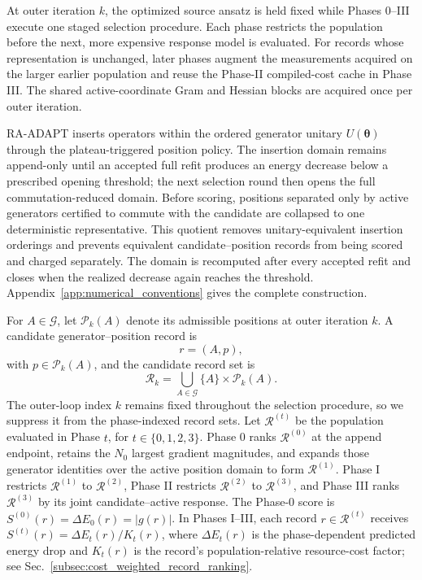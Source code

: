 \documentclass[
  reprint,
  amsmath,
  amssymb,
  aps,
  pra,
  nofootinbib,
  superscriptaddress,
  floatfix
]{revtex4-2}
\begin{document}
At outer iteration \(k\), the optimized source ansatz is held fixed while
Phases 0--III execute one staged selection procedure. Each phase
restricts the population before the next, more expensive response model is
evaluated. For records whose representation is unchanged, later phases augment
the measurements acquired on the larger earlier population and reuse the
Phase-II compiled-cost cache in Phase III. The shared active-coordinate Gram
and Hessian blocks are acquired once per outer iteration.

RA-ADAPT inserts operators within the ordered generator unitary
\(U(\boldsymbol{\theta})\) through the plateau-triggered position policy. The insertion domain remains append-only
until an accepted full refit produces an energy decrease below a prescribed
opening threshold; the next selection round then opens
the full commutation-reduced domain. Before scoring, positions
separated only by active generators certified to commute with the candidate
are collapsed to one deterministic representative. This quotient removes
unitary-equivalent insertion orderings and prevents equivalent
candidate--position records from being scored and charged separately. The
domain is recomputed after every accepted refit and closes when the realized
decrease again reaches the threshold. Appendix~\ref{app:numerical_conventions}
gives the complete construction.

For \(A\in\mathcal G\), let \(\mathcal P_k(A)\) denote its admissible positions
at outer iteration \(k\). A candidate generator--position record is
\[
r=(A,p),
\]
with \(p\in\mathcal P_k(A)\), and the candidate record set is
\begin{equation}
\mathcal R_k
=
\bigcup_{A\in\mathcal G}
\{A\}\times\mathcal P_k(A).
\label{record_set}
\end{equation}
The outer-loop index \(k\) remains fixed throughout the selection procedure, so we suppress
it from the phase-indexed record sets. Let \(\mathcal R^{(t)}\) be the
population evaluated in Phase \(t\), for \(t\in\{0,1,2,3\}\). Phase 0 ranks
\(\mathcal R^{(0)}\) at the append endpoint, retains the \(N_0\) largest
gradient magnitudes, and expands those generator identities over the active
position domain to form \(\mathcal R^{(1)}\).
Phase I restricts \(\mathcal R^{(1)}\) to \(\mathcal R^{(2)}\), Phase II restricts
\(\mathcal R^{(2)}\) to \(\mathcal R^{(3)}\), and Phase III ranks
\(\mathcal R^{(3)}\) by its joint candidate--active response. The Phase-0
score is \(S^{(0)}(r)=\Delta E_0(r)=|g(r)|\). In Phases I--III, each record
\(r\in\mathcal R^{(t)}\) receives
\(S^{(t)}(r)=\Delta E_t(r)/K_t(r)\), where \(\Delta E_t(r)\) is the
phase-dependent predicted energy drop and \(K_t(r)\) is the record's
population-relative resource-cost factor; see
Sec.~\ref{subsec:cost_weighted_record_ranking}.
\end{document}
